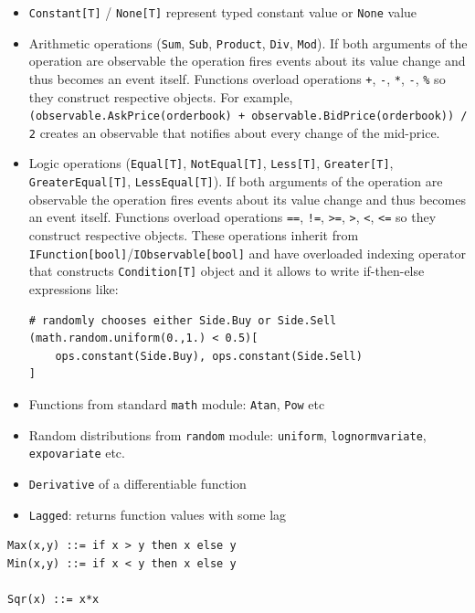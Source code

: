 \documentclass[a4paper,11pt]{article}
\begin{document}
\begin{itemize}
\item
  \texttt{Constant{[}T{]}} / \texttt{None{[}T{]}} represent typed
  constant value or \texttt{None} value
\item
  Arithmetic operations (\texttt{Sum}, \texttt{Sub}, \texttt{Product},
  \texttt{Div}, \texttt{Mod}). If both arguments of the operation are
  observable the operation fires events about its value change and thus
  becomes an event itself. Functions overload operations \texttt{+},
  \texttt{-}, \texttt{*}, \texttt{-}, \texttt{\%} so they construct
  respective objects. For example,
  \texttt{(observable.AskPrice(orderbook) + observable.BidPrice(orderbook)) / 2}
  creates an observable that notifies about every change of the
  mid-price.
\item
  Logic operations (\texttt{Equal{[}T{]}}, \texttt{NotEqual{[}T{]}},
  \texttt{Less{[}T{]}}, \texttt{Greater{[}T{]}},
  \texttt{GreaterEqual{[}T{]}}, \texttt{LessEqual{[}T{]}}). If both
  arguments of the operation are observable the operation fires events
  about its value change and thus becomes an event itself. Functions
  overload operations \texttt{==}, \texttt{!=}, \texttt{\textgreater{}=}, \texttt{\textgreater{}}, \texttt{\textless{}}, \texttt{\textless{}=} so they construct
  respective objects. These operations inherit from
  \texttt{IFunction{[}bool{]}}/\texttt{IObservable{[}bool{]}} and have
  overloaded indexing operator that constructs \texttt{Condition{[}T{]}}
  object and it allows to write if-then-else expressions like:

\begin{verbatim}
# randomly chooses either Side.Buy or Side.Sell
(math.random.uniform(0.,1.) < 0.5)[ 
    ops.constant(Side.Buy), ops.constant(Side.Sell) 
]
\end{verbatim}
\item
  Functions from standard \texttt{math} module: \texttt{Atan},
  \texttt{Pow} etc
\item
  Random distributions from \texttt{random} module: \texttt{uniform},
  \texttt{lognormvariate}, \texttt{expovariate} etc.
\item
  \texttt{Derivative} of a differentiable function
\item
  \texttt{Lagged}: returns function values with some lag
\end{itemize}

\begin{verbatim}
Max(x,y) ::= if x > y then x else y
Min(x,y) ::= if x < y then x else y

Sqr(x) ::= x*x
\end{verbatim}
\end{document}
